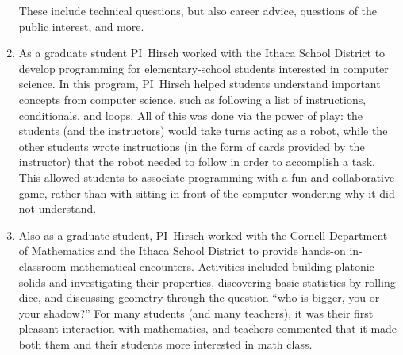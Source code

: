 \begin{enumerate}
  These include technical questions, but also career advice, questions of the public interest, and more.
\item As a graduate student PI~Hirsch worked with the Ithaca School District to develop programming for elementary-school students interested in computer science.
  In this program, PI~Hirsch helped students understand important concepts from computer science, such as following a list of instructions, conditionals, and loops.
  All of this was done via the power of play: the students (and the instructors) would take turns acting as a robot, while the other students wrote instructions (in the form of cards provided by the instructor) that the robot needed to follow in order to accomplish a task.
  This allowed students to associate programming with a fun and collaborative game, rather than with sitting in front of the computer wondering why it did not understand.
\item Also as a graduate student, PI~Hirsch worked with the Cornell Department of Mathematics and the Ithaca School District to provide hands-on in-classroom mathematical encounters.
  Activities included building platonic solids and investigating their properties, discovering basic statistics by rolling dice, and discussing geometry through the question ``who is bigger, you or your shadow?''
  For many students (and many teachers), it was their first pleasant interaction with mathematics, and teachers commented that it made both them and their students more interested in math class.
\end{enumerate}


